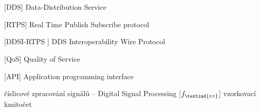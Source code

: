 \cleardoublepage
\chapter*{\listofabbrevname}
{}

\begin{acronym}[KolikMista]

		[DDS\textsuperscript \textregistered ]
		{Data-Distribution Service\textsuperscript \textregistered}
		
		[RTPS]
		{Real Time Publish Subscribe protocol}
		
	    [DDSI-RTPS\textsuperscript{\texttrademark} ]
	    {DDS Interoperability Wire Protocol\textsuperscript{\texttrademark}}
		
		[QoS]
		{Quality of Service}
		
		[API]
		{Application programming interface}
		

		{číslicové zpracování signálů -- Digital Signal Processing}
		[\ensuremath{f_\textind{vz}}] %
		{vzorkovací kmitočet}					%

\end{acronym}
